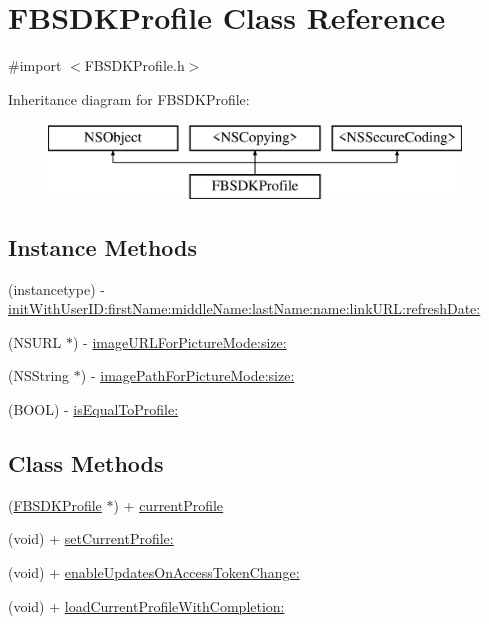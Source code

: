 \hypertarget{interface_f_b_s_d_k_profile}{}\section{F\+B\+S\+D\+K\+Profile Class Reference}
\label{interface_f_b_s_d_k_profile}


{\ttfamily \#import $<$F\+B\+S\+D\+K\+Profile.\+h$>$}

Inheritance diagram for F\+B\+S\+D\+K\+Profile\+:\begin{figure}[H]
\begin{center}
\leavevmode
\includegraphics[height=2.000000cm]{interface_f_b_s_d_k_profile}
\end{center}
\end{figure}
\subsection*{Instance Methods}
\begin{DoxyCompactItemize}
\item 
(instancetype) -\/ \hyperlink{interface_f_b_s_d_k_profile_acadd65cc553c1bdf49aceb92a30556b5}{init\+With\+User\+I\+D\+:first\+Name\+:middle\+Name\+:last\+Name\+:name\+:link\+U\+R\+L\+:refresh\+Date\+:}
\item 
(N\+S\+U\+R\+L $\ast$) -\/ \hyperlink{interface_f_b_s_d_k_profile_ae92f13abe18b85250f1c52f8efa0534f}{image\+U\+R\+L\+For\+Picture\+Mode\+:size\+:}
\item 
(N\+S\+String $\ast$) -\/ \hyperlink{interface_f_b_s_d_k_profile_af0563cc4253d202a5d6db19698e34da4}{image\+Path\+For\+Picture\+Mode\+:size\+:}
\item 
(B\+O\+O\+L) -\/ \hyperlink{interface_f_b_s_d_k_profile_ad33c3ef5b9f7875b25319bc5d7b2f360}{is\+Equal\+To\+Profile\+:}
\end{DoxyCompactItemize}
\subsection*{Class Methods}
\begin{DoxyCompactItemize}
\item 
(\hyperlink{interface_f_b_s_d_k_profile}{F\+B\+S\+D\+K\+Profile} $\ast$) + \hyperlink{interface_f_b_s_d_k_profile_a38bbb7b3aa2faccef349a8ecca18f78d}{current\+Profile}
\item 
(void) + \hyperlink{interface_f_b_s_d_k_profile_a68a76c246e717b3a9187316295fa1876}{set\+Current\+Profile\+:}
\item 
(void) + \hyperlink{interface_f_b_s_d_k_profile_a2464165f05f9109a0e60af7adc3a5ca8}{enable\+Updates\+On\+Access\+Token\+Change\+:}
\item 
(void) + \hyperlink{interface_f_b_s_d_k_profile_a6b90b1dbc181725c0218bb7fe7ffc024}{load\+Current\+Profile\+With\+Completion\+:}
\end{DoxyCompactItemize}
